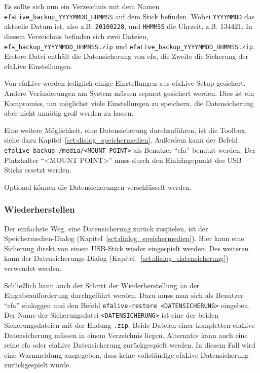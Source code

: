 \documentclass[a4paper,12pt,twoside]{article}
\begin{document}
Es sollte sich nun ein Verzeichnis mit dem Namen\\
\texttt{efaLive\_backup\_YYYYMMDD\_HHMMSS} auf dem
Stick befinden. Wobei \texttt{YYYYMMDD} das aktuelle Datum ist, also z.B.
\texttt{20100228}, und \texttt{HHMMSS} die Uhrzeit, z.B. 134421. In diesem Verzeichnis
befinden sich zwei Dateien,
\texttt{efa\_backup\_YYYYMMDD\_HHMMSS.zip} und
\texttt{efaLive\_backup\_YYYYMMDD\_HHMMSS.zip}.
Erstere Datei enthält die Datensicherung von efa, die Zweite die
Sicherung der efaLive Einstellungen.

Von efaLive werden lediglich einige Einstellungen aus efaLive-Setup
gesichert. Andere Veränderungen am System müssen separat gesichert
werden. Dies ist ein Kompromiss, um möglichst viele Einstellungen zu
speichern, die Datensicherung aber nicht unnötig groß werden zu lassen.

Eine weitere Möglichkeit, eine Datensicherung durchzuführen, ist die
Toolbox, siehe dazu Kapitel~\ref{sct:dialog_speichermedien}. Außerdem kann der Befehl
\texttt{efalive-backup /media/{\textless}MOUNT POINT{\textgreater}} 
als Benutzer "`efa"' benutzt werden. Der Platzhalter "`{\textless}MOUNT 
POINT{\textgreater}"' muss durch den Einhängepunkt des USB Sticks 
ersetzt werden.

Optional können die Datensicherungen verschlüsselt werden.


\subsubsection{Wiederherstellen}
\label{sct:daten_wiederherstellen}
Der einfachste Weg, eine Datensicherung zurück zuspielen, ist der
Speichermedien-Dialog (Kapitel~\ref{sct:dialog_speichermedien}). Hier
kann eine Sicherung direkt von einem USB-Stick wieder eingespielt
werden. Des weiteren kann der Datensicherungs-Dialog (Kapitel
~\ref{sct:dialog_datensicherung}) verwendet werden.

Schließlich kann auch der Schritt der Wiederherstellung an der
Eingabeaufforderung durchgeführt werden. Dazu muss man sich als
Benutzer "`efa"' einloggen und den Befehl
\texttt{efalive-restore {\textless}DATENSICHERUNG{\textgreater}} eingeben. Der
Name der Sicherungsdatei \texttt{{\textless}DATENSICHERUNG{\textgreater}} ist
eine der beiden Sicherungsdateien mit der Endung \texttt{.zip}. Beide Dateien
einer kompletten efaLive Datensicherung müssen in einem Verzeichnis liegen. 
Alternativ kann auch eine reine efa oder efaLive Datensicherung zurückgespielt
werden. In diesem Fall wird eine Warnmeldung ausgegeben, dass keine vollständige
efaLive Datensicherung zurückgespielt wurde.
\end{document}
